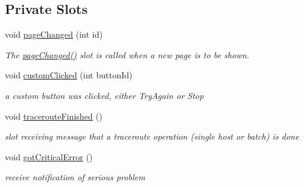 \subsection*{Private Slots}
\begin{CompactItemize}
\item 
void \hyperlink{classIXmapsWizard_b064d0cb97a40abc8ea405e7001fcce9}{pageChanged} (int id)
\begin{CompactList}\small\item\em The \hyperlink{classIXmapsWizard_b064d0cb97a40abc8ea405e7001fcce9}{pageChanged()} slot is called when a new page is to be shown. \item\end{CompactList}\item 
\hypertarget{classIXmapsWizard_bc438476fd76c20d235ab754b053eb4d}{
void \hyperlink{classIXmapsWizard_bc438476fd76c20d235ab754b053eb4d}{customClicked} (int buttonId)}
\label{classIXmapsWizard_bc438476fd76c20d235ab754b053eb4d}

\begin{CompactList}\small\item\em a custom button was clicked, either TryAgain or Stop \item\end{CompactList}\item 
\hypertarget{classIXmapsWizard_536a51454aacd61362ed37d1453a5aa0}{
void \hyperlink{classIXmapsWizard_536a51454aacd61362ed37d1453a5aa0}{tracerouteFinished} ()}
\label{classIXmapsWizard_536a51454aacd61362ed37d1453a5aa0}

\begin{CompactList}\small\item\em slot receiving message that a traceroute operation (single host or batch) is done \item\end{CompactList}\item 
\hypertarget{classIXmapsWizard_53004c1d08c731223e3531121382f14d}{
void \hyperlink{classIXmapsWizard_53004c1d08c731223e3531121382f14d}{gotCriticalError} ()}
\label{classIXmapsWizard_53004c1d08c731223e3531121382f14d}

\begin{CompactList}\small\item\em receive notification of serious problem \item\end{CompactList}\end{CompactItemize}
